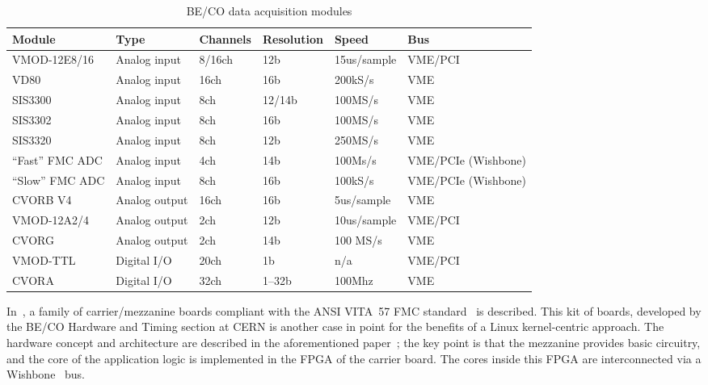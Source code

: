 \documentclass{JAC2003}
\begin{document}
\begin{table*}[ht]
   \centering
   \caption{BE/CO data acquisition modules}
   \begin{tabular}{llllll}
       \toprule
	\textbf{Module}& \textbf{Type}& \textbf{Channels}& 
	\textbf{Resolution}& \textbf{Speed}& \textbf{Bus} \\ 
       \midrule
	VMOD-12E8/16    &  Analog input  & 8/16ch & 12b    & 15us/sample & VME/PCI  \\
	VD80            &  Analog input  & 16ch   & 16b    & 200kS/s     & VME  \\
	SIS3300         &  Analog input  & 8ch    & 12/14b & 100MS/s     & VME  \\
	SIS3302         &  Analog input  & 8ch    & 16b    & 100MS/s     & VME  \\
	SIS3320         &  Analog input  & 8ch    & 12b    & 250MS/s     & VME  \\
	``Fast'' FMC ADC&  Analog input  & 4ch    & 14b    & 100Ms/s     & VME/PCIe (Wishbone)  \\
	``Slow'' FMC ADC&  Analog input  & 8ch    & 16b    & 100kS/s     & VME/PCIe (Wishbone)  \\
       \midrule
	CVORB V4        &  Analog output & 16ch   &  16b   &  5us/sample & VME 	 \\
	VMOD-12A2/4     &  Analog output & 2ch    &  12b   &  10us/sample& VME/PCI \\
	CVORG           &  Analog output & 2ch    &  14b   &  100 MS/s   & VME  \\
       \midrule
	VMOD-TTL        &  Digital I/O   & 20ch   & 1b     & n/a         & VME/PCI \\
	CVORA           &  Digital I/O   & 32ch   & 1--32b & 100Mhz	 & VME \\
       \bottomrule
   \end{tabular}
   \label{zio-modules}
\end{table*}


In~\cite{fpga-fmc}, a family of carrier/mezzanine boards compliant 
with the ANSI VITA~57 FMC standard~\cite{vita-fmc} is described. This kit of boards,
developed by the BE/CO Hardware and Timing section at CERN is
another case in point for the benefits of a Linux kernel-centric
approach. The hardware concept and architecture are described
in the aforementioned paper~\cite{fpga-fmc}; the key point is that the
mezzanine provides basic circuitry, and the core of the application
logic is implemented in the FPGA of the carrier board. The cores inside
this FPGA are interconnected via a Wishbone~\cite{wishbone-spec} bus.
\end{document}
